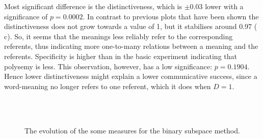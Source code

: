 \begin{description}
Most significant difference is the distinctiveness, which is $\pm 0.03$ lower with a significance of $p=0.0002$. In contrast to previous plots that have been shown the distinctiveness does not grow towards a value of 1, but it stabilises around 0.97 ( c). So, it seems that the meanings less reliably refer to the corresponding referents, thus indicating more one-to-many relations between a meaning and the referents. Specificity is higher than in the basic experiment indicating that polysemy is less. This observation, however, has a low significance: $p=0.1904$. Hence lower distinctiveness might explain a lower communicative success, since a word-meaning no longer refers to one referent, which it does when $D=1$.
\end{description}

\begin{figure}[t]
\centering
{}
\\
\\
\caption{The evolution of the some measures for the binary subspace method.}
\label{f:cat:bin}
\end{figure}

